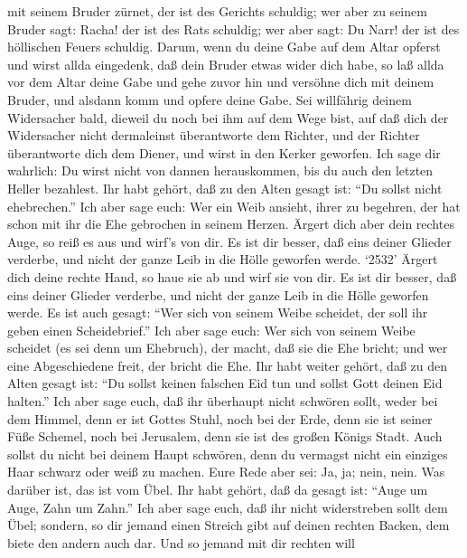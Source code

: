 mit seinem Bruder zürnet, der ist des Gerichts schuldig; wer aber zu
seinem Bruder sagt: Racha! der ist des Rats schuldig; wer aber sagt: Du
Narr! der ist des höllischen Feuers schuldig.  Darum, wenn
du deine Gabe auf dem Altar opferst und wirst allda eingedenk, daß dein
Bruder etwas wider dich habe,  so laß allda vor dem Altar
deine Gabe und gehe zuvor hin und versöhne dich mit deinem Bruder, und
alsdann komm und opfere deine Gabe.  Sei willfährig deinem
Widersacher bald, dieweil du noch bei ihm auf dem Wege bist, auf daß
dich der Widersacher nicht dermaleinst überantworte dem Richter, und der
Richter überantworte dich dem Diener, und wirst in den Kerker geworfen.
 Ich sage dir wahrlich: Du wirst nicht von dannen
herauskommen, bis du auch den letzten Heller bezahlest. 
Ihr habt gehört, daß zu den Alten gesagt ist: ``Du sollst nicht
ehebrechen.''  Ich aber sage euch: Wer ein Weib ansieht,
ihrer zu begehren, der hat schon mit ihr die Ehe gebrochen in seinem
Herzen.  Ärgert dich aber dein rechtes Auge, so reiß es aus
und wirf's von dir. Es ist dir besser, daß eins deiner Glieder verderbe,
und nicht der ganze Leib in die Hölle geworfen werde. 
`2532' Ärgert dich deine rechte Hand, so haue sie ab und wirf sie von
dir. Es ist dir besser, daß eins deiner Glieder verderbe, und nicht der
ganze Leib in die Hölle geworfen werde.  Es ist auch
gesagt: ``Wer sich von seinem Weibe scheidet, der soll ihr geben einen
Scheidebrief.''  Ich aber sage euch: Wer sich von seinem
Weibe scheidet (es sei denn um Ehebruch), der macht, daß sie die Ehe
bricht; und wer eine Abgeschiedene freit, der bricht die Ehe.
 Ihr habt weiter gehört, daß zu den Alten gesagt ist: ``Du
sollst keinen falschen Eid tun und sollst Gott deinen Eid halten.''
 Ich aber sage euch, daß ihr überhaupt nicht schwören
sollt, weder bei dem Himmel, denn er ist Gottes Stuhl, 
noch bei der Erde, denn sie ist seiner Füße Schemel, noch bei Jerusalem,
denn sie ist des großen Königs Stadt.  Auch sollst du nicht
bei deinem Haupt schwören, denn du vermagst nicht ein einziges Haar
schwarz oder weiß zu machen.  Eure Rede aber sei: Ja, ja;
nein, nein. Was darüber ist, das ist vom Übel.  Ihr habt
gehört, daß da gesagt ist: ``Auge um Auge, Zahn um Zahn.'' 
Ich aber sage euch, daß ihr nicht widerstreben sollt dem Übel; sondern,
so dir jemand einen Streich gibt auf deinen rechten Backen, dem biete
den andern auch dar.  Und so jemand mit dir rechten will
